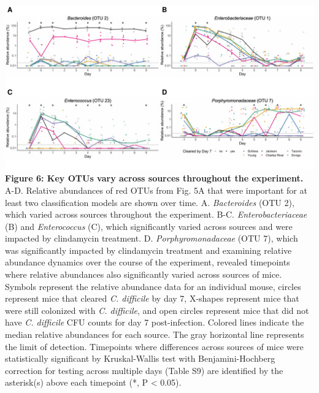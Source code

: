 \documentclass[11pt,]{article}
\begin{document}
\newpage

\includegraphics{figure_6.pdf} \textbf{Figure 6: Key OTUs vary across
sources throughout the experiment.} A-D. Relative abundances of red OTUs
from Fig. 5A that were important for at least two classification models
are shown over time. A. \emph{Bacteroides} (OTU 2), which varied across
sources throughout the experiment. B-C. \emph{Enterobacteriaceae} (B)
and \emph{Enterococcus} (C), which significantly varied across sources
and were impacted by clindamycin treatment. D. \emph{Porphyromonadaceae}
(OTU 7), which was significantly impacted by clindamycin treatment and
examining relative abundance dynamics over the course of the experiment,
revealed timepoints where relative abundances also significantly varied
across sources of mice. Symbols represent the relative abundance data
for an individual mouse, circles represent mice that cleared \emph{C.
difficile} by day 7, X-shapes represent mice that were still colonized
with \emph{C. difficile}, and open circles represent mice that did not
have \emph{C. difficile} CFU counts for day 7 post-infection. Colored
lines indicate the median relative abundances for each source. The gray
horizontal line represents the limit of detection. Timepoints where
differences across sources of mice were statistically significant by
Kruskal-Wallis test with Benjamini-Hochberg correction for testing
across multiple days (Table S9) are identified by the asterisk(s) above
each timepoint (*, P \textless{} 0.05).

\newpage
\end{document}
